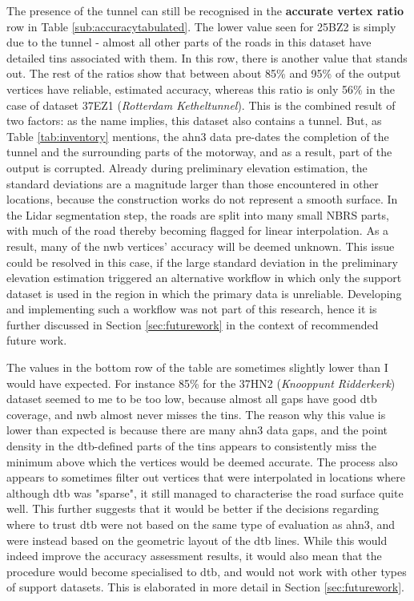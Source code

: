 The presence of the tunnel can still be recognised in the \textbf{accurate vertex ratio} row in Table \ref{sub:accuracytabulated}. The lower value seen for 25BZ2 is simply due to the tunnel - almost all other parts of the roads in this dataset have detailed \ac{tin}s associated with them. In this row, there is another value that stands out. The rest of the ratios show that between about 85\% and 95\% of the output vertices have reliable, estimated accuracy, whereas this ratio is only 56\% in the case of dataset 37EZ1 (\textit{Rotterdam Ketheltunnel}). This is the combined result of two factors: as the name implies, this dataset also contains a tunnel. But, as Table \ref{tab:inventory} mentions, the \ac{ahn3} data pre-dates the completion of the tunnel and the surrounding parts of the motorway, and as a result, part of the output is corrupted. Already during preliminary elevation estimation, the standard deviations are a magnitude larger than those encountered in other locations, because the construction works do not represent a smooth surface. In the Lidar segmentation step, the roads are split into many small NBRS parts, with much of the road thereby becoming flagged for linear interpolation. As a result, many of the \ac{nwb} vertices' accuracy will be deemed unknown. This issue could be resolved in this case, if the large standard deviation in the preliminary elevation estimation triggered an alternative workflow in which only the support dataset is used in the region in which the primary data is unreliable. Developing and implementing such a workflow was not part of this research, hence it is further discussed in Section \ref{sec:futurework} in the context of recommended future work.

The values in the bottom row of the table are sometimes slightly lower than I would have expected. For instance 85\% for the 37HN2 (\textit{Knooppunt Ridderkerk}) dataset seemed to me to be too low, because almost all gaps have good \ac{dtb} coverage, and \ac{nwb} almost never misses the \ac{tin}s. The reason why this value is lower than expected is because there are many \ac{ahn3} data gaps, and the point density in the \ac{dtb}-defined parts of the \ac{tin}s appears to consistently miss the minimum above which the vertices would be deemed accurate. The process also appears to sometimes filter out vertices that were interpolated in locations where although \ac{dtb} was "sparse", it still managed to characterise the road surface quite well. This further suggests that it would be better if the decisions regarding where to trust \ac{dtb} were not based on the same type of evaluation as \ac{ahn3}, and were instead based on the geometric layout of the \ac{dtb} lines. While this would indeed improve the accuracy assessment results, it would also mean that the procedure would become specialised to \ac{dtb}, and would not work with other types of support datasets. This is elaborated in more detail in Section \ref{sec:futurework}.

